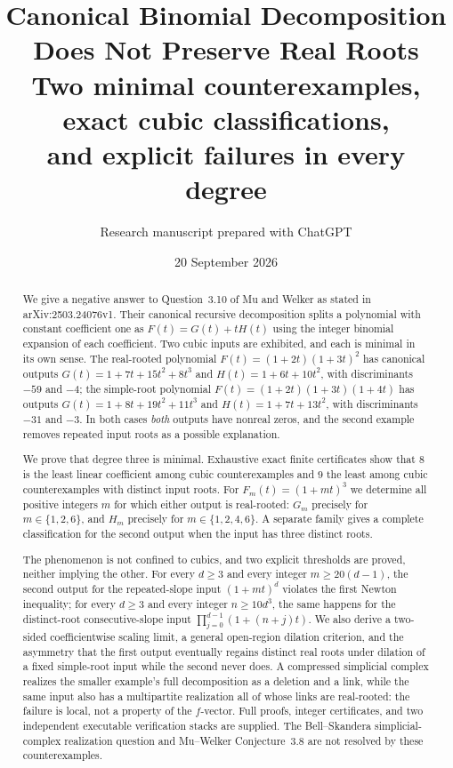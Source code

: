 \documentclass[11pt,letterpaper]{article}
\title{\LARGE\bfseries Canonical Binomial Decomposition\\
Does Not Preserve Real Roots\\[0.5em]
\large Two minimal counterexamples, exact cubic classifications,\\
and explicit failures in every degree}
\author{Research manuscript prepared with ChatGPT}
\date{20 September 2026}
\numberwithin{equation}{section}
\theoremstyle{definition}
\theoremstyle{remark}
\begin{document}
\maketitle
\thispagestyle{empty}
\begin{abstract}
We give a negative answer to Question~3.10 of Mu and Welker as stated in
arXiv:2503.24076v1. Their canonical recursive decomposition splits a polynomial
with constant coefficient one as $F(t)=G(t)+tH(t)$ using the integer binomial
expansion of each coefficient. Two cubic inputs are exhibited, and each is
minimal in its own sense. The real-rooted polynomial
$F(t)=(1+2t)(1+3t)^2$ has canonical outputs
$G(t)=1+7t+15t^2+8t^3$ and $H(t)=1+6t+10t^2$, with discriminants $-59$
and $-4$; the simple-root polynomial $F(t)=(1+2t)(1+3t)(1+4t)$ has outputs
$G(t)=1+8t+19t^2+11t^3$ and $H(t)=1+7t+13t^2$, with discriminants $-31$ and
$-3$. In both cases \emph{both} outputs have nonreal zeros, and the second
example removes repeated input roots as a possible explanation.

We prove that degree three is minimal. Exhaustive exact finite certificates
show that $8$ is the least linear coefficient among cubic counterexamples and
$9$ the least among cubic counterexamples with distinct input roots. For
$F_m(t)=(1+mt)^3$ we determine all positive integers $m$ for which either
output is real-rooted: $G_m$ precisely for $m\in\{1,2,6\}$, and $H_m$
precisely for $m\in\{1,2,4,6\}$. A separate family gives a complete
classification for the second output when the input has three distinct roots.

The phenomenon is not confined to cubics, and two explicit thresholds are
proved, neither implying the other. For every $d\ge3$ and every integer
$m\ge20(d-1)$, the second output for the repeated-slope input $(1+mt)^d$
violates the first Newton inequality; for every $d\ge3$ and every integer
$n\ge10d^3$, the same happens for the distinct-root consecutive-slope input
$\prod_{j=0}^{d-1}(1+(n+j)t)$. We also derive a two-sided coefficientwise
scaling limit, a general open-region dilation criterion, and the asymmetry
that the first output eventually regains distinct real roots under dilation of
a fixed simple-root input while the second never does. A compressed simplicial
complex realizes the smaller example's full decomposition as a deletion and a
link, while the same input also has a multipartite realization all of whose
links are real-rooted: the failure is local, not a property of the $f$-vector.
Full proofs, integer certificates, and two independent executable
verification stacks are supplied. The Bell--Skandera simplicial-complex
realization question and Mu--Welker Conjecture~3.8 are not resolved by these
counterexamples.
\end{abstract}
\end{document}
